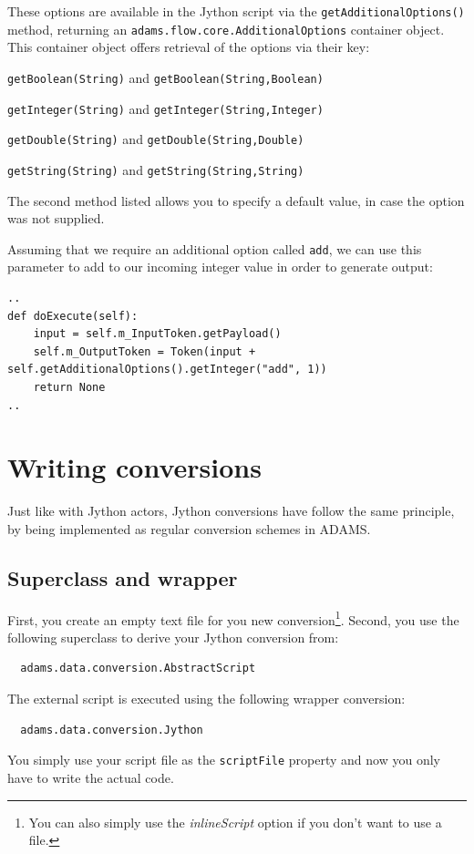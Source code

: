 \documentclass[a4paper]{book}
\begin{document}
These options are available in the Jython script via the
\texttt{getAdditionalOptions()} method, returning an
\texttt{adams.flow.core.AdditionalOptions} container object. This container
object offers retrieval of the options via their key:
\begin{tight_itemize}
	\item \texttt{getBoolean(String)} and \texttt{getBoolean(String,Boolean)}
	\item \texttt{getInteger(String)} and \texttt{getInteger(String,Integer)}
	\item \texttt{getDouble(String)} and \texttt{getDouble(String,Double)}
	\item \texttt{getString(String)} and \texttt{getString(String,String)}
\end{tight_itemize}
The second method listed allows you to specify a default value, in case the
option was not supplied.

Assuming that we require an additional option called \texttt{add}, we can use
this parameter to add to our incoming integer value in order to generate output:
{\small
\begin{verbatim}
..
def doExecute(self):
    input = self.m_InputToken.getPayload()
    self.m_OutputToken = Token(input + self.getAdditionalOptions().getInteger("add", 1))
    return None
..
\end{verbatim}
}

\chapter{Writing conversions}
Just like with Jython actors, Jython conversions have follow the same principle,
by being implemented as regular conversion schemes in ADAMS.

\section{Superclass and wrapper}
First, you create an empty text file for you new 
conversion\footnote{You can also simply use the \textit{inlineScript} option if you don't 
want to use a file.}. Second, you use the following superclass to derive your 
Jython conversion from:
\begin{verbatim}
  adams.data.conversion.AbstractScript
\end{verbatim}
The external script is executed using the following wrapper conversion:
\begin{verbatim}
  adams.data.conversion.Jython
\end{verbatim}
You simply use your script file as the \texttt{scriptFile} property and now you
only have to write the actual code.
\end{document}
